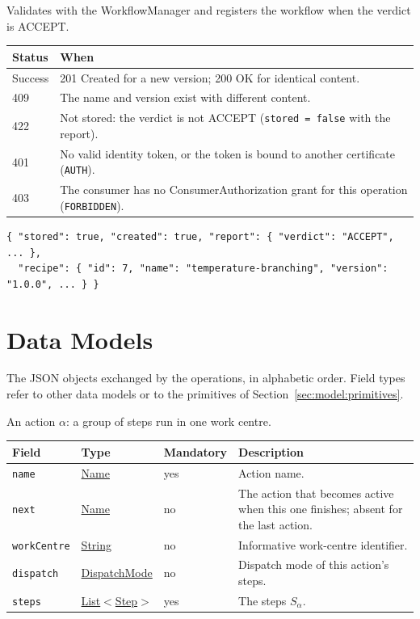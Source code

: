 \documentclass[a4paper]{arrowhead}
\newcommand{\mref}[1]{{\textcolor{ArrowheadPurple}{\hyperref[sec:model:#1]{#1}}}}
\newcommand{\pref}[1]{{\textcolor{ArrowheadGrey}{\hyperref[sec:model:primitives:#1]{#1}}}}
\begin{document}
Validates with the WorkflowManager and registers the workflow when the verdict is ACCEPT.

{\small
\begin{longtable}{|p{2.0cm}|p{13.8cm}|}

\hline
\rowcolor{gray!33} Status & When \\ \hline
\endhead
Success & 201 Created for a new version; 200 OK for identical content. \\ \hline
409 & The name and version exist with different content. \\ \hline
422 & Not stored: the verdict is not ACCEPT (\texttt{stored = false} with the report). \\ \hline
401 & No valid identity token, or the token is bound to another certificate (\texttt{AUTH}). \\ \hline
403 & The consumer has no ConsumerAuthorization grant for this operation (\texttt{FORBIDDEN}). \\ \hline
\end{longtable}
}


\begin{lstlisting}[caption={Example response body}]
{ "stored": true, "created": true, "report": { "verdict": "ACCEPT", ... },
  "recipe": { "id": 7, "name": "temperature-branching", "version": "1.0.0", ... } }
\end{lstlisting}


\newpage
\section{Data Models}
\label{sec:model}
The JSON objects exchanged by the operations, in alphabetic order. Field types refer to other data models or to the
primitives of Section~\ref{sec:model:primitives}.

An action $\alpha$: a group of steps run in one work centre.

{\small
\begin{longtable}{|p{3.7cm}|p{4.2cm}|p{1.6cm}|p{6.3cm}|}

\hline
\rowcolor{gray!33} Field & Type & Mandatory & Description \\ \hline
\endhead
\texttt{name} & \pref{Name} & yes & Action name. \\ \hline
\texttt{next} & \pref{Name} & no & The action that becomes active when this one finishes; absent for the last action. \\ \hline
\texttt{workCentre} & \pref{String} & no & Informative work-centre identifier. \\ \hline
\texttt{dispatch} & \mref{DispatchMode} & no & Dispatch mode of this action's steps. \\ \hline
\texttt{steps} & \pref{List}$<$\mref{Step}$>$ & yes & The steps $S_\alpha$. \\ \hline
\end{longtable}
}
\end{document}
